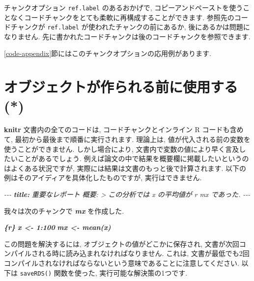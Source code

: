 \documentclass[
  11pt,
  lualatex,ja=standard,jafont=noto]{bxjsreport}
\newenvironment{Shaded}{\begin{snugshade}}{\end{snugshade}}
\newcommand{\AnnotationTok}[1]{\textcolor[rgb]{0.56,0.35,0.01}{\textbf{\textit{#1}}}}
\newcommand{\CommentTok}[1]{\textcolor[rgb]{0.56,0.35,0.01}{\textit{#1}}}
\newcommand{\InformationTok}[1]{\textcolor[rgb]{0.56,0.35,0.01}{\textbf{\textit{#1}}}}
\newcommand{\NormalTok}[1]{#1}
\begin{document}
チャンクオプション \texttt{ref.label} のあるおかげで, コピーアンドペーストを使うことなくコードチャンクをとても柔軟に再構成することができます. 参照先のコードチャンクが \texttt{ref.label} が使われたチャンクの前にあるか, 後にあるかは問題になりません. 先に書かれたコードチャンクは後のコードチャンクを参照できます.

\ref{code-appendix}節にはこのチャンクオプションの応用例があります.

\hypertarget{load-cache}{%
\section{オブジェクトが作られる前に使用する (*)}\label{load-cache}}

\textbf{knitr} 文書内の全てのコードは, コードチャンクとインライン R コードも含めて, 最初から最後まで順番に実行されます. 理論上は, 値が代入される前の変数を使うことができません. しかし場合により, 文書内で変数の値により早く言及したいことがあるでしょう. 例えば論文の中で結果を概要欄に掲載したいというのはよくある状況ですが, 実際には結果は文書のもっと後で計算されます. 以下の例はそのアイディアを具体化したものですが, 実行はできません.

\begin{Shaded}
\begin{Highlighting}[]
\CommentTok{{-}{-}{-}}
\AnnotationTok{title:}\CommentTok{ 重要なレポート}
\CommentTok{概要: \textgreater{}}
\CommentTok{  この分析では \textasciigrave{}x\textasciigrave{} の平均値が}
\CommentTok{  \textasciigrave{}r mx\textasciigrave{} であった.}
\CommentTok{{-}{-}{-}}

\NormalTok{我々は次のチャンクで }\InformationTok{\textasciigrave{}mx\textasciigrave{}}\NormalTok{ を作成した.}

\InformationTok{\textasciigrave{}\textasciigrave{}\textasciigrave{}\{r\}}
\InformationTok{x \textless{}{-} 1:100}
\InformationTok{mx \textless{}{-} mean(x)}
\InformationTok{\textasciigrave{}\textasciigrave{}\textasciigrave{}}
\end{Highlighting}
\end{Shaded}

この問題を解決するには, オブジェクトの値がどこかに保存され, 文書が次回コンパイルされる時に読み込まれなければなりません. これは, 文書が最低でも2回コンパイルされなければならないという意味であることに注意してください. 以下は \texttt{saveRDS()} 関数を使った, 実行可能な解決策の1つです.
\end{document}
